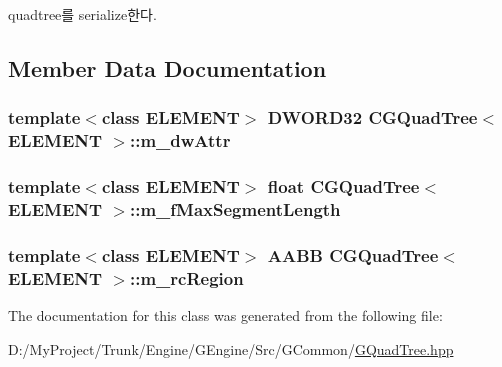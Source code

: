 \begin{DoxyItemize}
\item quadtree를 serialize한다. 
\end{DoxyItemize}

\subsection{Member Data Documentation}
\hypertarget{class_c_g_quad_tree_afd877e6e52d2e1a8ebf81b100f4f4b9b}{}
\subsubsection[{m\+\_\+dw\+Attr}]{\setlength{\rightskip}{0pt plus 5cm}template$<$class E\+L\+E\+M\+E\+N\+T$>$ D\+W\+O\+R\+D32 {\bf C\+G\+Quad\+Tree}$<$ E\+L\+E\+M\+E\+N\+T $>$\+::m\+\_\+dw\+Attr\hspace{0.3cm}{\ttfamily [protected]}}\label{class_c_g_quad_tree_afd877e6e52d2e1a8ebf81b100f4f4b9b}
\hypertarget{class_c_g_quad_tree_ae8d52b50ee3731209be5004325e31914}{}
\subsubsection[{m\+\_\+f\+Max\+Segment\+Length}]{\setlength{\rightskip}{0pt plus 5cm}template$<$class E\+L\+E\+M\+E\+N\+T$>$ float {\bf C\+G\+Quad\+Tree}$<$ E\+L\+E\+M\+E\+N\+T $>$\+::m\+\_\+f\+Max\+Segment\+Length\hspace{0.3cm}{\ttfamily [protected]}}\label{class_c_g_quad_tree_ae8d52b50ee3731209be5004325e31914}
\hypertarget{class_c_g_quad_tree_ad2c6d0ba557e981c73c21cde5f7cdbc4}{}
\subsubsection[{m\+\_\+rc\+Region}]{\setlength{\rightskip}{0pt plus 5cm}template$<$class E\+L\+E\+M\+E\+N\+T$>$ {\bf A\+A\+B\+B} {\bf C\+G\+Quad\+Tree}$<$ E\+L\+E\+M\+E\+N\+T $>$\+::m\+\_\+rc\+Region\hspace{0.3cm}{\ttfamily [protected]}}\label{class_c_g_quad_tree_ad2c6d0ba557e981c73c21cde5f7cdbc4}


The documentation for this class was generated from the following file\+:\begin{DoxyCompactItemize}
\item 
D\+:/\+My\+Project/\+Trunk/\+Engine/\+G\+Engine/\+Src/\+G\+Common/\hyperlink{_g_quad_tree_8hpp}{G\+Quad\+Tree.\+hpp}\end{DoxyCompactItemize}
